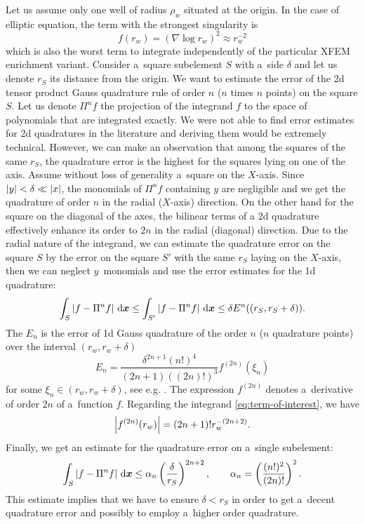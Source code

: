 Let us assume only one well of radius $\rho_w$ situated at the origin. In the case of elliptic equation, the term with the strongest singularity is 
\begin{equation}
    \label{eq:term-of-interest}
    f(r_w)=(\nabla \log r_w )^2 \approx r_w^{-2}
\end{equation}
which is also the worst term to integrate independently of the particular XFEM enrichment variant.
Consider a~square subelement $S$ with a~side $\delta$ and 
let us denote $r_{S}$ its distance from the origin.
We want to estimate the error of the 2d tensor product Gauss quadrature rule of order $n$ ($n$ times $n$ points) on the square $S$. 
Let us denote 
$\Pi^n f$ the projection of the integrand $f$ to the space of polynomials that are integrated exactly.
We were not able to find error estimates for 2d quadratures in the literature and deriving them would be extremely technical.
However, we can make an observation that among the squares of the same $r_{S}$, the quadrature error is the highest for the squares lying on one of the axis.
Assume without loss of generality a~square on the $X$-axis. Since $\left|y\right|<\delta \ll \left|x\right|$, the monomials of $\Pi^n f$ containing $y$ 
are negligible and we get the quadrature
of order $n$ in the radial ($X$-axis) direction. On the other hand for the square on the diagonal of the axes, the bilinear terms of 
a 2d quadrature effectively enhance its order to $2n$ in the radial (diagonal) direction. Due to the radial nature of the integrand,
we can estimate the quadrature error on the square $S$ by the error on the square $S'$ with the same $r_S$ laying on the $X$-axis, then we can 
neglect $y$~monomials and use the error estimates for the 1d quadrature:
\begin{equation}
  \int_S \left|f-\Pi^n f\right| \,{\rm d}\mathbf{\boldsymbol{x}} \le \int_{S'}\left|f-\Pi^n f\right| \,{\rm d}\mathbf{\boldsymbol{x}} \le \delta E^n((r_{S}, r_{S}+\delta)).
\end{equation}
The $E_n$ is the error of 1d Gauss quadrature of the order $n$ ($n$ quadrature points) over the interval $(r_w,r_w+\delta)$
\begin{equation}
  E_n = \frac{\delta^{2n+1} (n!)^4}{(2n+1)((2n)!)^3} f^{(2n)}(\xi_n) 
\end{equation}
for some $\xi_n \in (r_w, r_w+\delta)$, see e.g. \cite{kahaner_numerical_1989}. 
The expression $f^{(2n)}$ denotes a~derivative of order $2n$ of a~function $f$.
Regarding the integrand \eqref{eq:term-of-interest}, we have 
\begin{equation}
  \left|f^{(2n)}(r_w)\right| = (2n+1)! r_w^{-(2n+2)}.
\end{equation}
Finally, we get an estimate for the quadrature error on a~single subelement:
\begin{equation}
    \int_S \left|f-\Pi^n f\right|  \,{\rm d}\mathbf{\boldsymbol{x}} \le  \alpha_n \left( \frac{\delta}{r_{S}} \right)^{2n+2}, 
  \qquad \alpha_n = \left( \frac{(n!)^2}{(2n)!} \right)^2.
\end{equation}
This estimate implies that we have to ensure $\delta < r_S$ in order to get a~decent quadrature error 
and possibly to employ a~higher order quadrature. 


